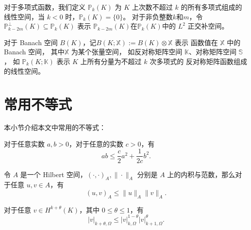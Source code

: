 对于多项式函数，我们定义
$\mathbb P_k(K)$ 为 $K$ 上次数不超过 $k$
的所有多项式组成的线性空间，当 $k < 0$ 时，$\mathbb P_k(K) = \{0\}$。
对于非负整数$k$和$m$，令$\mathbb{P}_{k-2m}^{\perp}(K) \subseteq
\mathbb{P}_k(K)$ 表示 $\mathbb{P}_{k-2m}(K)$在$\mathbb{P}_k(K)$中的
$L^2$
正交补空间。

对于 Banach 空间 $B(K)$，记$B(K; \mathbb{X}):=B(K)\otimes\mathbb{X}$ 表示
函数值在 $\mathbb{X}$ 中的 Banach 空间，
其中$\mathbb{X}$ 为某个张量空间，
如反对称矩阵空间 $\mathbb{K}$、对称矩阵空间 $\mathbb{S}$，
如 $\mathbb{P}_k(K; \mathbb{K})$ 表示 $K$ 上所有分量为不超过 $k$ 次多项式的
反对称矩阵函数组成的线性空间。


\section{常用不等式}
本小节介绍本文中常用的不等式：
\begin{lemma}
    对于任意实数 $a, b > 0$，对于任意的实数 $c>0$，有
    $$
    ab\leq \frac{c}{2}a^2 + \frac{1}{2c}b^2.
    $$
\end{lemma}
\begin{lemma}
    令 $A$ 是一个 Hilbert 空间，$(\cdot, \cdot)_A, \|\cdot\|_A$ 分别是
    $A$ 上的内积与范数，那么对于任意 $u, v\in A$，有
    $$
    (u, v)_A \leq \|u\|_A\|v\|_A.
    $$
\end{lemma}
\begin{lemma} %
    对于任意 $v \in H^{k+\theta}(K)$，其中 $0\leq \theta\leq 1$，有
    $$
    |v|_{k+\theta, \Omega} \leq |v|_{k, \Omega}^{1-\theta}|v|_{k+1,
    \Omega}^{\theta}.
    $$
\end{lemma}

